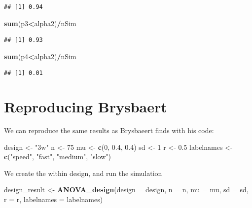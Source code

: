 \documentclass[]{book}
\newenvironment{Shaded}{\begin{snugshade}}{\end{snugshade}}
\newcommand{\DataTypeTok}[1]{\textcolor[rgb]{0.13,0.29,0.53}{#1}}
\newcommand{\DecValTok}[1]{\textcolor[rgb]{0.00,0.00,0.81}{#1}}
\newcommand{\FloatTok}[1]{\textcolor[rgb]{0.00,0.00,0.81}{#1}}
\newcommand{\KeywordTok}[1]{\textcolor[rgb]{0.13,0.29,0.53}{\textbf{#1}}}
\newcommand{\NormalTok}[1]{#1}
\newcommand{\OperatorTok}[1]{\textcolor[rgb]{0.81,0.36,0.00}{\textbf{#1}}}
\newcommand{\StringTok}[1]{\textcolor[rgb]{0.31,0.60,0.02}{#1}}
\begin{document}
\begin{verbatim}
## [1] 0.94
\end{verbatim}

\begin{Shaded}
\begin{Highlighting}[]
\KeywordTok{sum}\NormalTok{(p3}\OperatorTok{<}\NormalTok{alpha2)}\OperatorTok{/}\NormalTok{nSim}
\end{Highlighting}
\end{Shaded}

\begin{verbatim}
## [1] 0.93
\end{verbatim}

\begin{Shaded}
\begin{Highlighting}[]
\KeywordTok{sum}\NormalTok{(p4}\OperatorTok{<}\NormalTok{alpha2)}\OperatorTok{/}\NormalTok{nSim}
\end{Highlighting}
\end{Shaded}

\begin{verbatim}
## [1] 0.01
\end{verbatim}

\hypertarget{reproducing-brysbaert}{%
\section{Reproducing Brysbaert}\label{reproducing-brysbaert}}

We can reproduce the same results as Brysbaeert finds with his code:

\begin{Shaded}
\begin{Highlighting}[]
\NormalTok{design <-}\StringTok{ "3w"}
\NormalTok{n <-}\StringTok{ }\DecValTok{75}
\NormalTok{mu <-}\StringTok{ }\KeywordTok{c}\NormalTok{(}\DecValTok{0}\NormalTok{, }\FloatTok{0.4}\NormalTok{, }\FloatTok{0.4}\NormalTok{)}
\NormalTok{sd <-}\StringTok{ }\DecValTok{1}
\NormalTok{r <-}\StringTok{ }\FloatTok{0.5}
\NormalTok{labelnames <-}\StringTok{ }\KeywordTok{c}\NormalTok{(}\StringTok{"speed"}\NormalTok{, }\StringTok{"fast"}\NormalTok{, }\StringTok{"medium"}\NormalTok{, }\StringTok{"slow"}\NormalTok{)}
\end{Highlighting}
\end{Shaded}

We create the within design, and run the simulation

\begin{Shaded}
\begin{Highlighting}[]
\NormalTok{design_result <-}\StringTok{ }\KeywordTok{ANOVA_design}\NormalTok{(}\DataTypeTok{design =}\NormalTok{ design,}
                   \DataTypeTok{n =}\NormalTok{ n, }
                   \DataTypeTok{mu =}\NormalTok{ mu, }
                   \DataTypeTok{sd =}\NormalTok{ sd, }
                   \DataTypeTok{r =}\NormalTok{ r, }
                   \DataTypeTok{labelnames =}\NormalTok{ labelnames)}
\end{Highlighting}
\end{Shaded}
\end{document}
